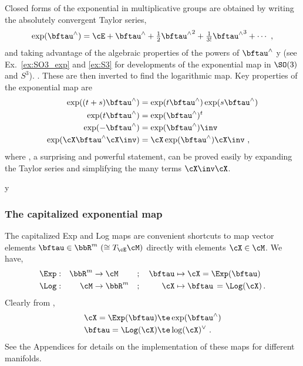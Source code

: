 Closed forms of the exponential in multiplicative groups are obtained by writing the absolutely convergent Taylor series, 
%
\begin{align}
\exp(\bftau\hhat)=\cE+\bftau\hhat+\tfrac12{\bftau\hhat}^2+\tfrac1{3!}{\bftau\hhat}^3+\cdots
~,
\end{align}
%
and taking advantage of the algebraic properties of the powers of $\bftau\hhat$%
\if \examples y (see Ex.~\ref{ex:SO3_exp} and \ref{ex:S3} for developments of the exponential map in $\SO(3)$ and $S^3$). \else. \fi 
These are then inverted to find the logarithmic map.
%
Key properties of the exponential map are 
%
\begin{align}
\exp((t+s)\bftau\hhat) 
 &= \exp(t\bftau\hhat)\exp(s\bftau\hhat) \label{equ:prop_exp_ts}
 \\
\exp(t\bftau\hhat) 
 &= \exp(\bftau\hhat)^t \label{equ:prop_exp_t}
 \\
\exp(-\bftau\hhat) 
 &= \exp(\bftau\hhat)\inv \label{equ:prop_exp_inv}
 \\
\exp(\cX\bftau\hhat\cX\inv) 
 &= \cX\exp(\bftau\hhat)\cX\inv ~, \label{equ:prop_exp}
\end{align} 
%
where , a surprising and powerful statement, can be proved easily by expanding the Taylor series and simplifying the many terms $\cX\inv\cX$.

\if\examples y

\fi



\subsubsection[The capitalized Exp map]{The capitalized exponential map}


The capitalized Exp and Log maps are convenient shortcuts to map vector elements $\bftau\in\bbR^m~(\cong\mtanat{\cM}{\cE})$ directly with elements $\cX\in\cM$.
% 
We have,
%
\begin{align}
\Exp &: &\bbR^m &\to\cM &&;&
\,\bftau &\mapsto \cX = \Exp(\bftau)\\
\Log  &: & \cM &\to\bbR^m &&;&
 \cX &\mapsto \bftau\,=\Log(\cX) 
\,. 
\end{align}
%
Clearly from ,
%
\begin{align}
\cX  = \Exp(\bftau) &\te \exp(\bftau\hhat) \\
\bftau =\Log(\cX)    &\te \log(\cX)\vvee 
~. 
\end{align}
%
See the Appendices for details on the implementation of these maps for different manifolds.


